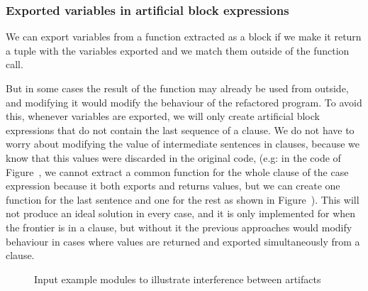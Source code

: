 \subsubsection{Exported variables in artificial block expressions\label{sub:interference}}

We can export variables from a function extracted as a block if we
make it return a tuple with the variables exported and we match them
outside of the function call.

But in some cases the result of the function may already be used from
outside, and modifying it would modify the behaviour of the refactored
program. To avoid this, whenever variables are exported, we will only
create artificial block expressions that do not contain the last sequence
of a clause. We do not have to worry about modifying the value of
intermediate sentences in clauses, because we know that this values
were discarded in the original code, (e.g: in the code of Figure~,
we cannot extract a common function for the whole clause of the case
expression because it both exports and returns values, but we can
create one function for the last sentence and one for the rest as
shown in Figure~). This will not produce an ideal solution in every
case, and it is only implemented for when the frontier is in a clause,
but without it the previous approaches would modify behaviour in cases
where values are returned and exported simultaneously from a clause.

\begin{figure}
\begin{minipage}[t]{0.5\columnwidth}%
%
\end{minipage}%
\begin{minipage}[t]{0.5\columnwidth}%
%
\end{minipage}

\caption{Input example modules to illustrate interference between artifacts\label{fig:interference-input}}
\end{figure}


